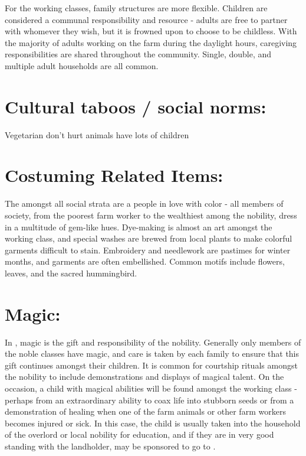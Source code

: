 \documentclass[blue]{GL2020}
\begin{document}
For the working classes, family structures are more flexible.  Children are considered a communal responsibility and resource - adults are free to partner with whomever they wish, but it is frowned upon to choose to be childless.  With the majority of adults working on the farm during the daylight hours, caregiving responsibilities are shared throughout the community.  Single, double, and multiple adult households are all common.       

\section*{Cultural taboos / social norms:}


Vegetarian
don't hurt animals
have lots of children

\section*{Costuming Related Items:}

The \pFarm{} amongst all social strata are a people in love with color - all members of society, from the poorest farm worker to the wealthiest among the nobility, dress in a multitude of gem-like hues.  Dye-making is almost an art amongst the working class, and special washes are brewed from local plants to make colorful garments difficult to stain.  Embroidery and needlework are pastimes for winter months, and garments are often embellished.  Common motifs include flowers, leaves, and the sacred hummingbird.

\section*{Magic:}

In \pFarm{}, magic is the gift and responsibility of the nobility. Generally only members of the noble classes have magic, and care is taken by each family to ensure that this gift continues amongst their children.  It is common for courtship rituals amongst the nobility to include demonstrations and displays of magical talent.  On the occasion, a child with magical abilities will be found amongst the working class - perhaps from an extraordinary ability to coax life into stubborn seeds or from a demonstration of healing when one of the farm animals or other farm workers becomes injured or sick.  In this case, the child is usually taken into the household of the overlord or local nobility for education, and if they are in very good standing with the landholder, may be sponsored to go to \pSchool{}.
\end{document}
